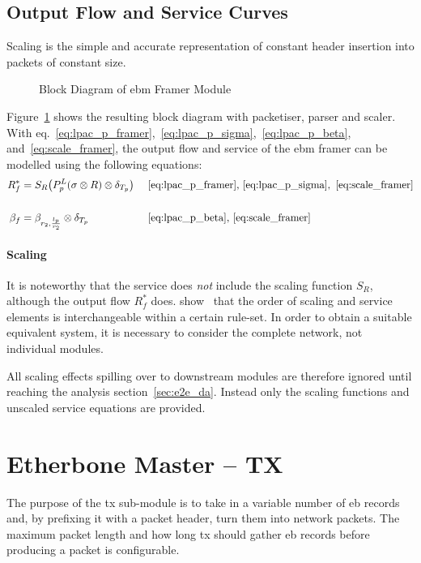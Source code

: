 \subsection{Output Flow and Service Curves}
Scaling is the simple and accurate representation of constant header insertion into packets of constant size.
\begin{figure}[H]
  \centering
  \def\svgwidth{0.6875\textwidth}
  
  \caption{Block Diagram of \gls{ebm} Framer Module}
  \label{fig:framer}
\end{figure}
\noindent
Figure~\ref{fig:framer} shows the resulting block diagram with packetiser, parser and scaler.
With eq.~\ref{eq:lpac_p_framer},~\ref{eq:lpac_p_sigma},~\ref{eq:lpac_p_beta}, and~\ref{eq:scale_framer}, the output flow and service of the \gls{ebm} framer can be modelled using the following equations:
%
\begin{align}
R^*_f &= S_R \big(P^L_p (\sigma \otimes R) \otimes \delta_{T_p} \big) &&\text{~\ref{eq:lpac_p_framer},~\ref{eq:lpac_p_sigma}},~\ref{eq:scale_framer} \label{eq:out_framer}\\ 
\notag\\
\beta_f &=  \beta_{r_2, \frac{l_p}{r_2}} \otimes \delta_{T_p} &&\text{~\ref{eq:lpac_p_beta},~\ref{eq:scale_framer}} \label{eq:beta_framer}
\end{align}
%
\paragraph{Scaling}
It is noteworthy that the service does \emph{not} include the scaling function $S_R$, although the output flow $R^*_f$ does.
\citeauthor{fidler_way_2006} show~\cite{fidler_way_2006} that the order of scaling and service elements is interchangeable within a certain rule-set.
In order to obtain a suitable equivalent system, it is necessary to consider the complete network, not individual modules.
\par
All scaling effects spilling over to downstream modules are therefore ignored until reaching the analysis section~\ref{sec:e2e_da}.
Instead only the scaling functions and unscaled service equations are provided.


\section{Etherbone Master -- TX}
\label{sec:ebm_tx}
The purpose of the \gls{tx} sub-module is to take in a variable number of \gls{eb} records and, by prefixing it with a packet header, turn them into network packets.
The maximum packet length and how long \gls{tx} should gather \gls{eb} records before producing a packet is configurable.

